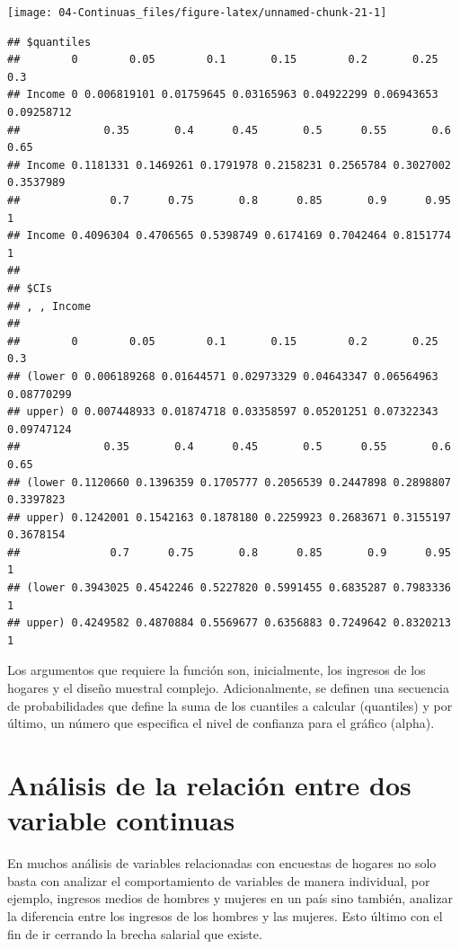 \documentclass[
  12pt,
]{book}
\begin{document}
\begin{center}\texttt{[image: 04-Continuas\_files/figure-latex/unnamed-chunk-21-1]} \end{center}

\begin{verbatim}
## $quantiles
##        0        0.05        0.1       0.15        0.2       0.25        0.3
## Income 0 0.006819101 0.01759645 0.03165963 0.04922299 0.06943653 0.09258712
##             0.35       0.4      0.45       0.5      0.55       0.6      0.65
## Income 0.1181331 0.1469261 0.1791978 0.2158231 0.2565784 0.3027002 0.3537989
##              0.7      0.75       0.8      0.85       0.9      0.95 1
## Income 0.4096304 0.4706565 0.5398749 0.6174169 0.7042464 0.8151774 1
## 
## $CIs
## , , Income
## 
##        0        0.05        0.1       0.15        0.2       0.25        0.3
## (lower 0 0.006189268 0.01644571 0.02973329 0.04643347 0.06564963 0.08770299
## upper) 0 0.007448933 0.01874718 0.03358597 0.05201251 0.07322343 0.09747124
##             0.35       0.4      0.45       0.5      0.55       0.6      0.65
## (lower 0.1120660 0.1396359 0.1705777 0.2056539 0.2447898 0.2898807 0.3397823
## upper) 0.1242001 0.1542163 0.1878180 0.2259923 0.2683671 0.3155197 0.3678154
##              0.7      0.75       0.8      0.85       0.9      0.95 1
## (lower 0.3943025 0.4542246 0.5227820 0.5991455 0.6835287 0.7983336 1
## upper) 0.4249582 0.4870884 0.5569677 0.6356883 0.7249642 0.8320213 1
\end{verbatim}

Los argumentos que requiere la función son, inicialmente, los ingresos de los hogares y el diseño muestral complejo. Adicionalmente, se definen una secuencia de probabilidades que define la suma de los cuantiles a calcular (quantiles) y por último, un número que especifica el nivel de confianza para el gráfico (alpha).

\hypertarget{anuxe1lisis-de-la-relaciuxf3n-entre-dos-variable-continuas}{%
\section{Análisis de la relación entre dos variable continuas}\label{anuxe1lisis-de-la-relaciuxf3n-entre-dos-variable-continuas}}

En muchos análisis de variables relacionadas con encuestas de hogares no solo basta con analizar el comportamiento de variables de manera individual, por ejemplo, ingresos medios de hombres y mujeres en un país sino también, analizar la diferencia entre los ingresos de los hombres y las mujeres. Esto último con el fin de ir cerrando la brecha salarial que existe.
\end{document}
